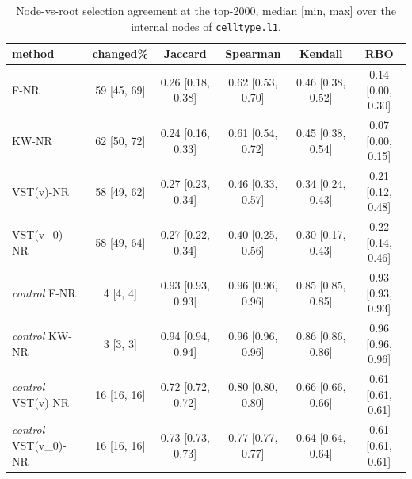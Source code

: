\begin{table}[t]
\centering
\small
\begin{tabular}{lccccc}
\toprule
method & changed\% & Jaccard & Spearman & Kendall & RBO \\
\midrule
F-NR & 59 [45, 69] & 0.26 [0.18, 0.38] & 0.62 [0.53, 0.70] & 0.46 [0.38, 0.52] & 0.14 [0.00, 0.30] \\
KW-NR & 62 [50, 72] & 0.24 [0.16, 0.33] & 0.61 [0.54, 0.72] & 0.45 [0.38, 0.54] & 0.07 [0.00, 0.15] \\
VST(v)-NR & 58 [49, 62] & 0.27 [0.23, 0.34] & 0.46 [0.33, 0.57] & 0.34 [0.24, 0.43] & 0.21 [0.12, 0.48] \\
VST(v\_0)-NR & 58 [49, 64] & 0.27 [0.22, 0.34] & 0.40 [0.25, 0.56] & 0.30 [0.17, 0.43] & 0.22 [0.14, 0.46] \\
\midrule
\textit{control} F-NR & 4 [4, 4] & 0.93 [0.93, 0.93] & 0.96 [0.96, 0.96] & 0.85 [0.85, 0.85] & 0.93 [0.93, 0.93] \\
\textit{control} KW-NR & 3 [3, 3] & 0.94 [0.94, 0.94] & 0.96 [0.96, 0.96] & 0.86 [0.86, 0.86] & 0.96 [0.96, 0.96] \\
\textit{control} VST(v)-NR & 16 [16, 16] & 0.72 [0.72, 0.72] & 0.80 [0.80, 0.80] & 0.66 [0.66, 0.66] & 0.61 [0.61, 0.61] \\
\textit{control} VST(v\_0)-NR & 16 [16, 16] & 0.73 [0.73, 0.73] & 0.77 [0.77, 0.77] & 0.64 [0.64, 0.64] & 0.61 [0.61, 0.61] \\
\bottomrule
\end{tabular}
\caption{Node-vs-root selection agreement at the top-2000, median [min, max] over the internal nodes of \texttt{celltype.l1}.}
\label{tab:hvg-summary-hao-L1}
\end{table}